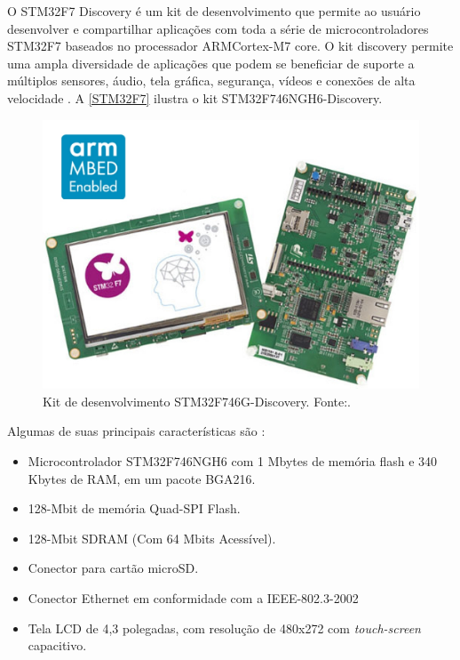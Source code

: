 O STM32F7 Discovery é um kit de desenvolvimento que permite ao usuário desenvolver e compartilhar aplicações com toda a série de microcontroladores STM32F7 baseados no processador ARM\textregistered  Cortex\textregistered-M7 core.
O kit discovery permite uma ampla diversidade de aplicações que podem se beneficiar de suporte a múltiplos sensores, áudio, tela gráfica, segurança, vídeos e conexões de alta velocidade \cite{STM32F7}.
A \autoref{STM32F7} ilustra o kit STM32F746NGH6-Discovery.

\begin{figure}[H]
    \scriptsize
     \centering
     \includegraphics[scale=0.4]{dados/figuras/STM32F7.jpg}
     \caption{Kit de desenvolvimento STM32F746G-Discovery. \newline Fonte:\cite{STM32F7}.}
     \label{STM32F7}
\end{figure}

Algumas de suas principais características são \cite{STM32F7}:
\begin{itemize}
    \item Microcontrolador STM32F746NGH6 com 1 Mbytes de memória flash e 340 Kbytes de RAM, em um pacote BGA216.
    \item 128-Mbit de memória Quad-SPI Flash.
    \item 128-Mbit SDRAM (Com 64 Mbits Acessível).
    \item Conector para cartão microSD.
    \item Conector Ethernet em conformidade com a IEEE-802.3-2002
    \item Tela LCD de 4,3 polegadas, com resolução de 480x272 com \textit{touch-screen} capacitivo.
    
\end{itemize}

